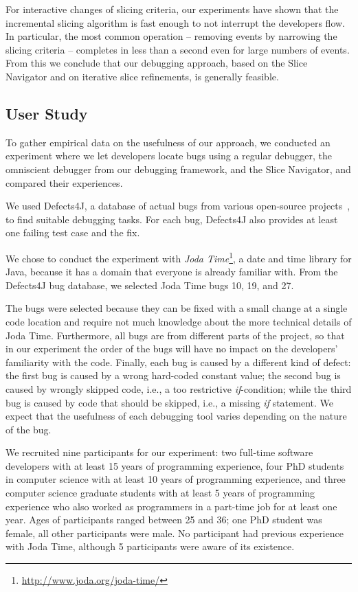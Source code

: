 For interactive changes of slicing criteria, our experiments have shown that the incremental slicing algorithm is fast enough to not interrupt the developers flow.
In particular, the most common operation -- removing events by narrowing the slicing criteria -- completes in less than a second even for large numbers of events.
From this we conclude that our debugging approach, based on the Slice Navigator and on iterative slice refinements, is generally feasible.

\subsection{User Study}

To gather empirical data on the usefulness of our approach, we conducted an experiment where we let developers locate bugs using a regular debugger, the omniscient debugger from our debugging framework, and the Slice Navigator, and compared their experiences.

We used Defects4J, a database of actual bugs from various open-source projects~\cite{just_defects4j_2014}, to find suitable debugging tasks.
For each bug, Defects4J also provides at least one failing test case and the fix.

We chose to conduct the experiment with \emph{Joda Time}\footnote{\url{http://www.joda.org/joda-time/}}, a date and time library for Java, because it has a domain that everyone is already familiar with.
From the Defects4J bug database, we selected Joda Time bugs 10, 19, and 27.

The bugs were selected because they can be fixed with a small change at a single code location and require not much knowledge about the more technical details of Joda Time.
Furthermore, all bugs are from different parts of the project, so that in our experiment the order of the bugs will have no impact on the developers' familiarity with the code.
Finally, each bug is caused by a different kind of defect:
the first bug is caused by a wrong hard-coded constant value;
the second bug is caused by wrongly skipped code, i.e., a too restrictive \textit{if}-condition;
while the third bug is caused by code that should be skipped, i.e., a missing \textit{if} statement.
We expect that the usefulness of each debugging tool varies depending on the nature of the bug.

We recruited nine participants for our experiment:
two full-time software developers with at least 15 years of programming experience, 
four PhD students in computer science with at least 10 years of programming experience,
and three computer science graduate students with at least 5 years of programming experience who also worked as programmers in a part-time job for at least one year.
Ages of participants ranged between 25 and 36; one PhD student was female, all other participants were male.
No participant had previous experience with Joda Time, although 5 participants were aware of its existence.

